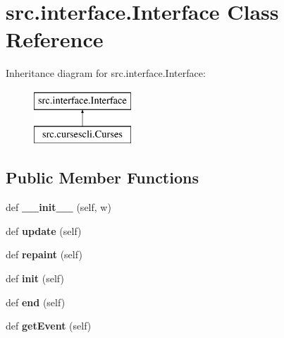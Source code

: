 \hypertarget{classsrc_1_1interface_1_1_interface}{}\section{src.\+interface.\+Interface Class Reference}
\label{classsrc_1_1interface_1_1_interface}
Inheritance diagram for src.\+interface.\+Interface\+:\begin{figure}[H]
\begin{center}
\leavevmode
\includegraphics[height=2.000000cm]{classsrc_1_1interface_1_1_interface}
\end{center}
\end{figure}
\subsection*{Public Member Functions}
\begin{DoxyCompactItemize}
\item 
\hypertarget{classsrc_1_1interface_1_1_interface_afd85ca0e9d4d7241eb7cc3fc278e382e}{}\label{classsrc_1_1interface_1_1_interface_afd85ca0e9d4d7241eb7cc3fc278e382e} 
def {\bfseries \+\_\+\+\_\+init\+\_\+\+\_\+} (self, w)
\item 
\hypertarget{classsrc_1_1interface_1_1_interface_a208bd509d61790c767cf2e2e244251e6}{}\label{classsrc_1_1interface_1_1_interface_a208bd509d61790c767cf2e2e244251e6} 
def {\bfseries update} (self)
\item 
\hypertarget{classsrc_1_1interface_1_1_interface_a568bdcd1f15799b98e7fddd66e53538a}{}\label{classsrc_1_1interface_1_1_interface_a568bdcd1f15799b98e7fddd66e53538a} 
def {\bfseries repaint} (self)
\item 
\hypertarget{classsrc_1_1interface_1_1_interface_a36f0c0435e8999755a96095c5b0d3e91}{}\label{classsrc_1_1interface_1_1_interface_a36f0c0435e8999755a96095c5b0d3e91} 
def {\bfseries init} (self)
\item 
\hypertarget{classsrc_1_1interface_1_1_interface_a7220f63d562c2a8eb934f8a7233fd326}{}\label{classsrc_1_1interface_1_1_interface_a7220f63d562c2a8eb934f8a7233fd326} 
def {\bfseries end} (self)
\item 
\hypertarget{classsrc_1_1interface_1_1_interface_aae4bd8e4081596c5dec5013aed5c8ac0}{}\label{classsrc_1_1interface_1_1_interface_aae4bd8e4081596c5dec5013aed5c8ac0} 
def {\bfseries get\+Event} (self)
\end{DoxyCompactItemize}
